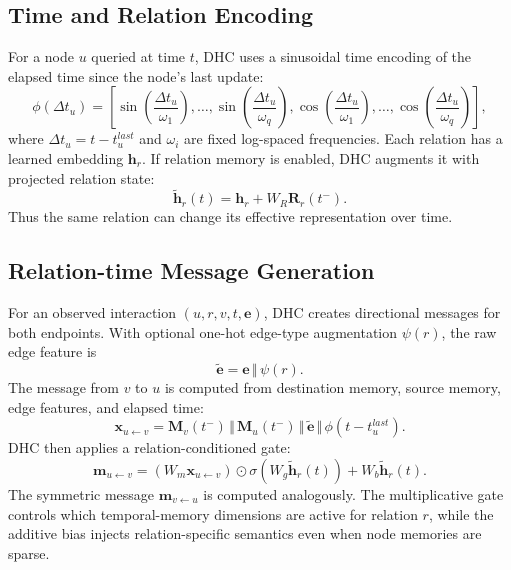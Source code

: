 \documentclass[runningheads]{llncs}
\begin{document}
\subsection{Time and Relation Encoding}
For a node $u$ queried at time $t$, DHC uses a sinusoidal time encoding of the elapsed time since the node's last update:
\begin{equation}
\phi(\Delta t_u)=\left[\sin\left(\frac{\Delta t_u}{\omega_1}\right),\ldots,\sin\left(\frac{\Delta t_u}{\omega_q}\right),
\cos\left(\frac{\Delta t_u}{\omega_1}\right),\ldots,\cos\left(\frac{\Delta t_u}{\omega_q}\right)\right],
\end{equation}
where $\Delta t_u=t-t_u^{last}$ and $\omega_i$ are fixed log-spaced frequencies. Each relation has a learned embedding $\mathbf{h}_r$. If relation memory is enabled, DHC augments it with projected relation state:
\begin{equation}
\tilde{\mathbf{h}}_r(t)=\mathbf{h}_r + W_R\mathbf{R}_r(t^-).
\end{equation}
Thus the same relation can change its effective representation over time.

\subsection{Relation-time Message Generation}
For an observed interaction $(u,r,v,t,\mathbf{e})$, DHC creates directional messages for both endpoints. With optional one-hot edge-type augmentation $\psi(r)$, the raw edge feature is
\begin{equation}
\tilde{\mathbf{e}}=\mathbf{e}\,\Vert\,\psi(r).
\end{equation}
The message from $v$ to $u$ is computed from destination memory, source memory, edge features, and elapsed time:
\begin{equation}
\mathbf{x}_{u\leftarrow v}=\mathbf{M}_v(t^-)\,\Vert\,\mathbf{M}_u(t^-)\,\Vert\,\tilde{\mathbf{e}}\,\Vert\,\phi(t-t_u^{last}).
\end{equation}
DHC then applies a relation-conditioned gate:
\begin{equation}
\mathbf{m}_{u\leftarrow v}=
\left(W_m\mathbf{x}_{u\leftarrow v}\right)\odot\sigma(W_g\tilde{\mathbf{h}}_r(t)) + W_b\tilde{\mathbf{h}}_r(t).
\end{equation}
The symmetric message $\mathbf{m}_{v\leftarrow u}$ is computed analogously. The multiplicative gate controls which temporal-memory dimensions are active for relation $r$, while the additive bias injects relation-specific semantics even when node memories are sparse.
\end{document}
